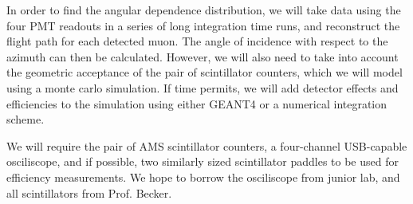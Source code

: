 In order to find the angular dependence distribution, we will take data using the four PMT readouts in a series of long integration time runs, and reconstruct the flight path for each detected muon. The angle of incidence with respect to the azimuth can then be calculated. However, we will also need to take into account the geometric acceptance of the pair of scintillator counters, which we will model using a monte carlo simulation. If time permits, we will add detector effects and efficiencies to the simulation using either GEANT4 or a numerical integration scheme.

We will require the pair of AMS scintillator counters, a four-channel USB-capable osciliscope, and if possible, two similarly sized scintillator paddles to be used for efficiency measurements. We hope to borrow the osciliscope from junior lab, and all scintillators from Prof. Becker.






